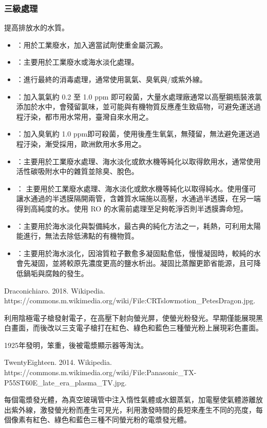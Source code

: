 \documentclass[a4paper,12pt]{report}
\begin{document}
\begin{itemize}
\begin{itemize}
\subsubsection{三級處理}
提高排放水的水質。
\begin{itemize}
\item {}：用於工業廢水，加入適當試劑使重金屬沉澱。
\item {}：主要用於工業廢水或海水淡化處理。
\item {}：進行最終的消毒處理，通常使用氯氣、臭氧與/或紫外線。
\bit
\item {}：加入氯氣約 0.2 至 1.0 ppm 即可殺菌，大量水處理廠通常以高壓鋼瓶裝液氯添加於水中，會殘留氯味，並可能與有機物質反應產生致癌物，可避免運送過程汙染，都市用水常用，臺灣自來水用之。
\item {}：加入臭氧約 1.0 ppm即可殺菌，使用後產生氧氣，無殘留，無法避免運送過程汙染，漸受採用，歐洲飲用水多用之。
\eit
\item {}：主要用於工業廢水處理、海水淡化或飲水機等純化以取得飲用水，通常使用活性碳吸附水中的雜質並除臭、脫色。
\item {}： 主要用於工業廢水處理、海水淡化或飲水機等純化以取得純水。使用僅可讓水通過的半透膜隔開兩管，含雜質水端施以高壓，水通過半透膜，在另一端得到高純度的水。使用 RO 的水需前處理至足夠乾淨否則半透膜壽命短。
\item {}：主要用於海水淡化與製備純水，最古典的純化方法之一，耗熱，可利用太陽能進行，無法去除低沸點的有機物質。
\item {}：主要用於海水淡化，因溶質粒子數愈多凝固點愈低，慢慢凝固時，較純的水會先凝固，並將較原先濃度更高的鹽水析出。凝固比蒸餾更節省能源，且可降低鍋垢與腐蝕的發生。
\end{itemize}
\bct\bfH\ctr{}\caption{Draconichiaro. 2018. Wikipedia.
\\https://commons.m.wikimedia.org/wiki/File:CRTslowmotion\_PetesDragon.jpg.}\ef\FB\ect
利用陰極電子槍發射電子，在高壓下射向螢光屏，使螢光粉發光。早期僅能展現黑白畫面，而後改以三支電子槍打在紅色、綠色和藍色三種螢光粉上展現彩色畫面。

1925年發明，笨重，後被電漿顯示器等淘汰。
\bct\bfH\ctr{}\caption{TwentyEighteen. 2014. Wikipedia. https://commons.m.wikimedia.org/wiki/File:Panasonic\_TX-P55ST60E\_late\_era\_plasma\_TV.jpg.}\ef\FB\ect
每個電漿發光體，為真空玻璃管中注入惰性氣體或水銀蒸氣，加電壓使氣體游離放出紫外線，激發螢光粉而產生可見光，利用激發時間的長短來產生不同的亮度，每個像素有紅色、綠色和藍色三種不同螢光粉的電漿發光體。


\end{itemize}
\end{itemize}
\end{document}
